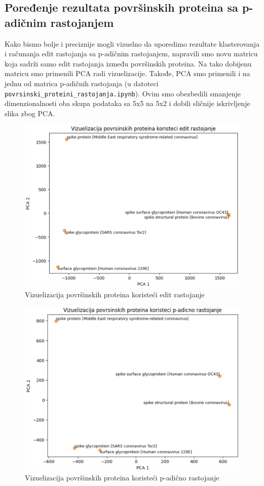 \documentclass[a4paper,12pt]{article}
\begin{document}
\subsection{Poređenje rezultata površinskih proteina sa p-adičnim rastojanjem}
Kako bismo bolje i preciznije mogli vizuelno da uporedimo rezultate klasterovanja i računanja edit rastojanja sa p-adičnim rastojanjem, napravili smo novu matricu koja sadrži samo edit rastojanja između površinskih proteina. Na tako dobijenu matricu smo primenili PCA radi vizuelizacije. Takođe, PCA smo primenili i na jednu od matrica p-adičnih rastojanja (u datoteci \texttt{povrsinski\_proteini\_rastojanja.ipynb}). Ovim smo obezbedili smanjenje dimenzionalnosti oba skupa podataka sa 5x5 na 5x2 i dobili sličnije iskrivljenje slika zbog PCA.

\bigskip
\begin{figure}[h!]
  \centering
  \includegraphics[width=1\textwidth]{slika26.jpeg}
  \caption{Vizuelizacija površinskih proteina koristeći edit rastojanje}
  \label{fig:my_label}
\end{figure}

\begin{figure}[h!]
  \centering
  \includegraphics[width=1\textwidth]{slika27.jpeg}
  \caption{Vizuelizacija površinskih proteina koristeći p-adično rastojanje}
  \label{fig:my_label}
\end{figure}
\end{document}
